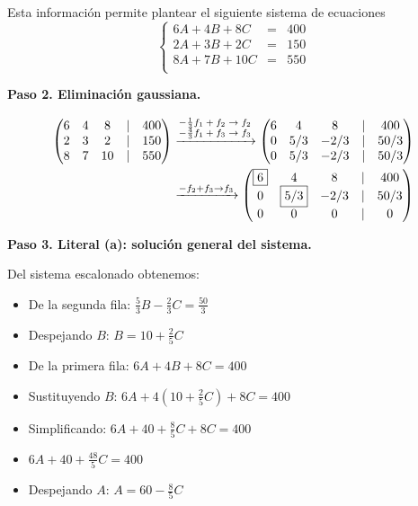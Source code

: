 \begin{prob}
\begin{myproof}
Esta información permite plantear el siguiente sistema de ecuaciones 
$$\left\lbrace \begin{array}{ccc}
6A+4B+8C&=&400\\
2A+3B+2C&=&150\\
8A+7B+10C&=&550\\
\end{array} \right.$$

\textbf{Paso 2. Eliminación gaussiana.}

\begin{align*}
\begin{pmatrix}
6&4&8&|&400\\
2&3&2&|&150\\
8&7&10&|&550
\end{pmatrix}&\xrightarrow{\begin{scriptsize}
\begin{matrix}
-\frac{1}{3} f_1+f_2 \rightarrow f_2\\ -\frac{4}{3} f_1+f_3 \rightarrow f_3
\end{matrix}\end{scriptsize}}\begin{pmatrix}
6 & 4 & 8 & |& 400 \\
0 & 5/3 & -2/3 & |&50/3 \\
0 & 5/3 & -2/3 &|& 50/3
\end{pmatrix} \\& \xrightarrow{-f_2+f_3 \rightarrow f_3}\begin{pmatrix}
\boxed{6} & 4 & 8 & |& 400 \\
0 & \boxed{5/3} & -2/3 & |&50/3 \\
0 & 0 & 0 &|& 0
\end{pmatrix}
\end{align*}

\textbf{Paso 3. Literal (a): solución general del sistema.}

Del sistema escalonado obtenemos:
\begin{itemize}
\item De la segunda fila: $\frac{5}{3}B - \frac{2}{3}C = \frac{50}{3}$
\item  Despejando $B$: $B = 10 + \frac{2}{5}C$
\item De la primera fila: $6A + 4B + 8C = 400$
\item Sustituyendo $B$: $6A + 4(10 + \frac{2}{5}C) + 8C = 400$
\item Simplificando: $6A + 40 + \frac{8}{5}C + 8C = 400$
\item $6A + 40 + \frac{48}{5}C = 400$
\item Despejando $A$: $A = 60 - \frac{8}{5}C$
\end{itemize}



\end{myproof}
\end{prob}
